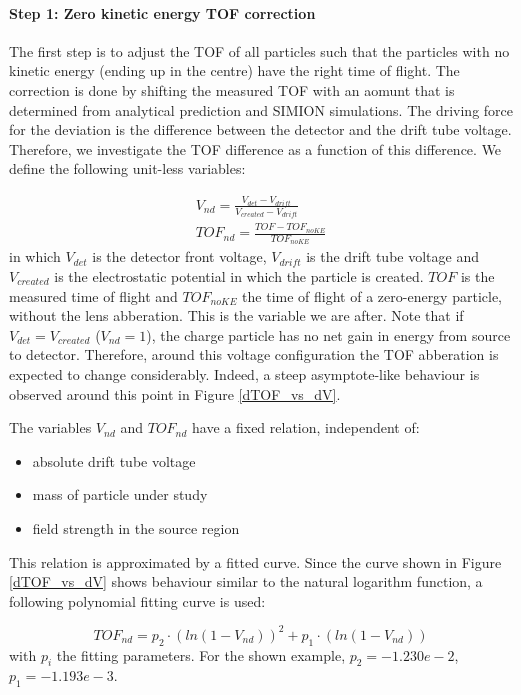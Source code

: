 \paragraph{Step 1: Zero kinetic energy TOF correction}

The first step is to adjust the TOF of all particles such that the particles with no kinetic energy (ending up in the centre) have the right time of flight. The correction is done by shifting the measured TOF with an aomunt that is determined from analytical prediction and SIMION simulations. The driving force for the deviation is the difference between the detector and the drift tube voltage. Therefore, we investigate the TOF difference as a function of this difference. We define the following unit-less variables:

\begin{align}
V_{nd} 		= \frac{V_{det} - V_{drift}}{V_{created} - V_{drift}} \\
TOF_{nd} 	= \frac{TOF - TOF_{noKE}}{TOF_{noKE}}
\end{align}
in which $V_{det}$ is the detector front voltage, $V_{drift}$ is the drift tube voltage and $V_{created}$ is the electrostatic potential in which the particle is created. $TOF$ is the measured time of flight and $TOF_{noKE}$ the time of flight of a zero-energy particle, without the lens abberation. This is the variable we are after. Note that if $V_{det} = V_{created}$ ($V_{nd} = 1$), the charge particle has no net gain in energy from source to detector. Therefore, around this voltage configuration the TOF abberation is expected to change considerably. Indeed, a steep asymptote-like behaviour is observed around this point in Figure \ref{dTOF_vs_dV}. 

The variables $V_{nd}$ and $TOF_{nd}$ have a fixed relation, independent of:
\begin{itemize}
\item absolute drift tube voltage
\item mass of particle under study
\item field strength in the source region
\end{itemize}

This relation is approximated by a fitted curve. Since the curve shown in Figure \ref{dTOF_vs_dV} shows behaviour similar to the natural logarithm function, a following polynomial fitting curve is used:

\begin{equation}
TOF_{nd} 	= p_2 \cdot \left(ln(1 -V_{nd}) \right)^2 + p_1 \cdot \left(ln(1 - V_{nd}) \right)
\end{equation}
with $p_i$ the fitting parameters. For the shown example, $p_2 = -1.230e-2$, $p_1 = -1.193e-3$.

